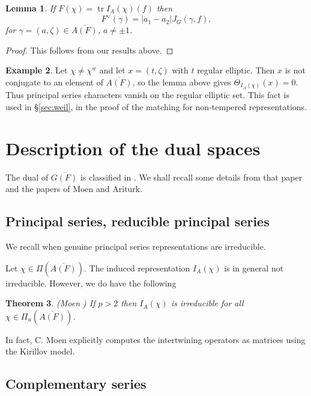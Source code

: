 \documentclass[12pt,letterpaper]{book}
\theoremstyle{plain}
\newtheorem{theorem}{Theorem}[chapter]
\newtheorem{lemma}[theorem]{Lemma}
\theoremstyle{definition}
\newtheorem{example}[theorem]{Example}
\theoremstyle{remark}
\theoremstyle{remark}
\newcommand{\tr}{\operatorname{tr}}
\begin{document}
\begin{lemma}
If $F(\chi)=\tr I_A(\chi)(f)$ then
\[
F^\vee(\gamma)
=|a_1-a_2|J_G(\gamma,f),
\]
for $\gamma =(a,\zeta)\in \overline{A(F)}$, $a\not= \pm 1$.
\end{lemma}

\begin{proof} This follows from our results above.
\end{proof}

\begin{example}
Let $\chi\neq\chi^w$ and let $x=(t,\zeta)$ with $t$ regular elliptic. Then
$x$ is not conjugate to an element of $\overline{A(F)}$, so the lemma above
gives $\Theta_{I_A(\chi)}(x)=0$. Thus principal series characters vanish on
the regular elliptic set. This fact is used in
\S\ref{sec:weil}, in the proof of the matching for non-tempered
representations.
\end{example}

\section{Description of the dual spaces}

The dual of $\overline{G(F)}$ is classified in \cite{Wa2}.
We shall recall some details from that paper and the
papers of Moen and Ariturk.

\subsection{Principal series, reducible principal series}

We recall when genuine principal series representations are irreducible.


Let $\chi \in \Pi (\overline{A(F)})$. The induced representation
$I_{A}(\chi )$ is in general not irreducible. However, we do have the
following

\begin{theorem}
(Moen \cite{Mo2}) If $p>2$ then $I_{A}(\chi )$ is
irreducible for all $\chi \in \Pi _u(\overline{A(F)})$.
\end{theorem}

In fact, C. Moen \cite{Mo1}
explicitly computes the intertwining operators as
matrices using the Kirillov model.

\subsection{Complementary series}
\end{document}
